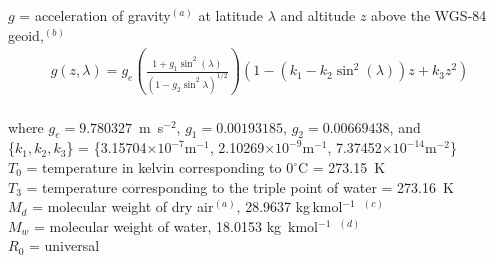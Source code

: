 \documentclass[
  english,
]{book}
\begin{document}
\(g\) = \label{-constant-g}acceleration
of gravity\(^{(a)}\) at latitude \(\lambda\)  and
altitude \(z\) above the WGS-84 geoid,\(^{(b)}\)
\begin{align}
g(z,\lambda)=g_{e}\left(\frac{1+g_{1}\sin^{2}(\lambda)}{(1-g_{2}\sin^{2}\lambda)^{1/2}}\right)(1-(k_{1}-k_{2}\sin^{2}(\lambda))z+k_{3}z^{2})
\label{eq:gsublambda}
\end{align}\\
\hspace*{0.333em}\hspace*{0.333em}\hspace*{0.333em}\hspace*{0.333em}\hspace*{0.333em}\hspace*{0.333em}\hspace*{0.333em}where \(g_{e}=9.780327\)~m~s\(^{-2}\), \(g_{1}=0.00193185\), \(g_{2}=0.00669438\), and\\
\hspace*{0.333em}\hspace*{0.333em}\hspace*{0.333em}\hspace*{0.333em}\hspace*{0.333em}\hspace*{0.333em}\hspace*{0.333em} \{\(k_{1},k_{2},k_{3}\)\} = \{3.15704\(\times 10^{-7}\mathrm{m}^{-1}\),
2.10269\(\times 10^{-9}\mathrm{m}^{-1}\), 7.37452\(\times 10^{-14}\mathrm{m}^{-2}\)\}\\
\(T_{0}\) = temperature in kelvin corresponding to \(0^{\circ}\)C = 273.15~K\\
\(T_{3}\) = temperature
corresponding to the triple point of water
= 273.16~K\\
\(M_{d}\) = molecular
weight of dry air\(^{(a)}\), 28.9637
kg\(\,\)kmol\(^{-1}\)~\(^{(c)}\)\\
\(M_{w}\) = molecular
weight of water, 18.0153 kg~kmol\(^{-1}\)~\(^{(d)}\)\\
\(R_{0}\) = universal
\end{document}
